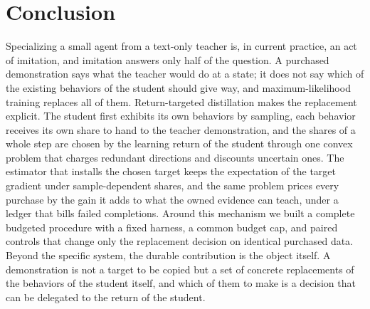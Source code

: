 \section{Conclusion}\label{sec:conclusion}
Specializing a small agent from a text-only teacher is, in current
practice, an act of imitation, and imitation answers only half of the
question. A purchased demonstration says what the teacher would do at
a state; it does not say which of the existing behaviors of the
student should give way, and maximum-likelihood training replaces all
of them. Return-targeted distillation makes the replacement explicit.
The student first exhibits its own behaviors by sampling, each
behavior receives its own share to hand to the teacher demonstration,
and the shares of a whole step are chosen by the learning return of
the student through one convex problem that charges redundant
directions and discounts uncertain ones. The estimator that installs
the chosen target keeps the expectation of the target gradient under
sample-dependent shares, and the same problem prices every purchase by
the gain it adds to what the owned evidence can teach, under a ledger
that bills failed completions. Around this mechanism we built a
complete budgeted procedure with a fixed harness, a common budget cap,
and paired controls that change only the replacement decision on
identical purchased data. Beyond the specific system, the durable
contribution is the object itself. A demonstration is not a target to
be copied but a set of concrete replacements of the behaviors of the student
itself, and which of them to make is a decision that can be
delegated to the return of the student.
